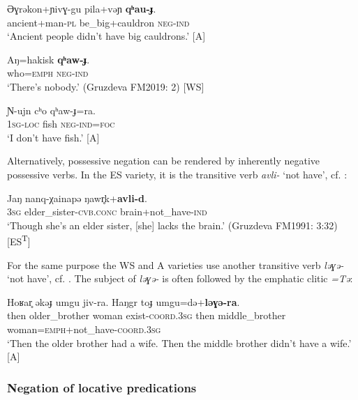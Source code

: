 \documentclass[output=paper,colorlinks,citecolor=brown]{langscibook}
\begin{document}
\ea\label{ex:niv:52}
    \gll Əɣrəkon+ɲivɣ{}-gu pila+vəɲ \textbf{qʰau-ɟ}. \\ 
          ancient+man-\textsc{pl} be\_big+cauldron \textsc{neg}{}-\textsc{ind} \\
    \glt ‘Ancient people didn’t have big cauldrons.’ \citep[160]{Panfilov1965} [A]
\z 

\ea\label{ex:niv:53}
    \gll  Aŋ=hakisk \textbf{qʰaw-ɟ}. \\ 
         who=\textsc{emph} \textsc{neg-ind} \\
    \glt ‘There’s nobody.’ (Gruzdeva FM2019: 2) [WS]
\z 

\ea\label{ex:niv:54}
    \gll Ɲ{}-ujn cʰo qʰaw-ɟ=ra. \\ 
         1\textsc{sg}{}-\textsc{loc} fish \textsc{neg-ind{}=foc} \\
    \glt ‘I don’t have fish.’ \citep[121]{Panfilov1965} [A]
\z 

Alternatively, possessive negation can be rendered by inherently negative possessive verbs. In the ES variety, it is the transitive verb \textit{avli-} ‘not have’, cf. :


\ea\label{ex:niv:55}
    \gll Jaŋ nanq-χainapə ŋawr̥k+\textbf{avli-d}. \\ 
         \textsc{3sg} elder\_sister-\textsc{cvb.conc} brain+not\_have-\textsc{ind} \\
    \glt ‘Though she’s an elder sister, [she] lacks the brain.’ (Gruzdeva FM1991: 3:32) [ES\textsuperscript{T}]
\z 

For the same purpose the WS and A varieties use another transitive verb \textit{ləɣə{}-} ‘not have’, cf. . The subject of \textit{ləɣə{}-} is often followed by the emphatic clitic \textit{=Tə}:


\ea\label{ex:niv:56}
    \gll Hoʁar̥ əkəɟ umgu jiv-ra. Haŋgr toɟ umgu=də+\textbf{ləɣə{}-ra}. \\
         then older\_brother woman exist-\textsc{coord.3sg} then middle\_brother woman=\textsc{emph}+not\_have-\textsc{coord.3sg}\\
    \glt ‘Then the older brother had a wife. Then the middle brother didn’t have a wife.’ \citep[160]{Panfilov1965} [A]
\z 


\subsubsection{Negation of locative predications}\label{sec:niv:2.3.3} 
\end{document}
